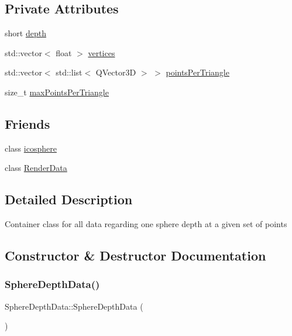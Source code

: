 \subsection*{Private Attributes}
\begin{DoxyCompactItemize}
\item 
short \hyperlink{class_sphere_depth_data_a32dc63866d12b3102942e14bb28238ff}{depth}
\item 
std\+::vector$<$ float $>$ \hyperlink{class_sphere_depth_data_a139a9131aa15308e012fc8190de2011d}{vertices}
\item 
std\+::vector$<$ std\+::list$<$ Q\+Vector3D $>$ $>$ \hyperlink{class_sphere_depth_data_a9decfacc00300c153ecff80288b7413f}{points\+Per\+Triangle}
\item 
size\+\_\+t \hyperlink{class_sphere_depth_data_a2c3d3f7d890da5ebb7ae989c648d169f}{max\+Points\+Per\+Triangle}
\end{DoxyCompactItemize}
\subsection*{Friends}
\begin{DoxyCompactItemize}
\item 
class \hyperlink{class_sphere_depth_data_a965765d9b47dfa6a5464d3e5cc39a66c}{icosphere}
\item 
class \hyperlink{class_sphere_depth_data_a85dbb35e50f4a9c4a1d0f0c783959bdb}{Render\+Data}
\end{DoxyCompactItemize}


\subsection{Detailed Description}
Container class for all data regarding one sphere depth at a given set of points 

\subsection{Constructor \& Destructor Documentation}
\mbox{\label{class_sphere_depth_data_adf3b418ea38626e3d768240d257504ea}} 
\subsubsection{\texorpdfstring{Sphere\+Depth\+Data()}{SphereDepthData()}\hspace{0.1cm}{\footnotesize\ttfamily [1/2]}}
{\footnotesize\ttfamily Sphere\+Depth\+Data\+::\+Sphere\+Depth\+Data (\begin{DoxyParamCaption}{ }\end{DoxyParamCaption})\hspace{0.3cm}{\ttfamily [default]}}

